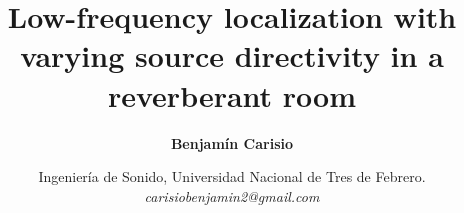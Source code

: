 \documentclass[10pt]{article} %
\begin{document}
\title{\textbf{\Large{Low-frequency localization with varying source directivity in a reverberant room}}}
\author{\textbf{Benjamín Carisio }\vspace{1ex}%
}
\date{\normalsize{Ingeniería de Sonido, Universidad Nacional de Tres de Febrero.}
    \\
    \textit{carisiobenjamin2@gmail.com}\vspace{-1ex}
}

\twocolumn[
    \begin{@twocolumnfalse}
        \maketitle
        
        \vspace*{1cm}
    \end{@twocolumnfalse}
]









\printbibliography[title={\large\textbf{REFERENCES}}]
\end{document}
